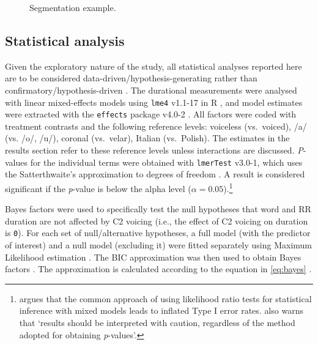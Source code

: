 \documentclass[preprint]{JASAnew}
\begin{document}
\begin{figure}
  \caption{Segmentation example.}
  \label{f:segmentation}
\end{figure}

\hypertarget{statistical-analysis}{%
\subsection{Statistical analysis}\label{statistical-analysis}}

Given the exploratory nature of the study, all statistical analyses
reported here are to be considered data-driven/hypothesis-generating
rather than confirmatory/hypothesis-driven
\citep{kerr1998, gelman2013, roettger2018}. The durational measurements
were analysed with linear mixed-effects models using \texttt{lme4}
v1.1-17 in R \citep{bates2015}, and model estimates were extracted with
the \texttt{effects} package v4.0-2 \citep{fox2003}. All factors were
coded with treatment contrasts and the following reference levels:
voiceless (vs.~voiced), /a/ (vs. /o/, /u/), coronal (vs.~velar), Italian
(vs.~Polish). The estimates in the results section refer to these
reference levels unless interactions are discussed. \emph{P}-values for
the individual terms were obtained with \texttt{lmerTest} v3.0-1, which
uses the Satterthwaite's approximation to degrees of freedom
\citep{kuznetsova2017, luke2017}. A result is considered significant if
the \emph{p}-value is below the alpha level
(\(\alpha = 0.05\)).\footnote{\citet{luke2017} argues that the common approach of using likelihood ratio tests for statistical inference with mixed models leads to inflated Type I error rates. \citet[1501]{luke2017} also warns that `results should be interpreted with caution, regardless of the method adopted for obtaining \textit{p}-values'.}

Bayes factors were used to specifically test the null hypotheses that
word and RR duration are not affected by C2 voicing (i.e., the effect of
C2 voicing on duration is \texttt{0}). For each set of null/alternative
hypotheses, a full model (with the predictor of interest) and a null
model (excluding it) were fitted separately using Maximum Likelihood
estimation \citep[p.~34]{bates2015}. The BIC approximation was then used
to obtain Bayes factors
\citep{raftery1995, raftery1999, wagenmakers2007, jarosz2014}. The
approximation is calculated according to the equation in \ref{eq:bayes}
\citep[p.~796]{wagenmakers2007}.
\end{document}
